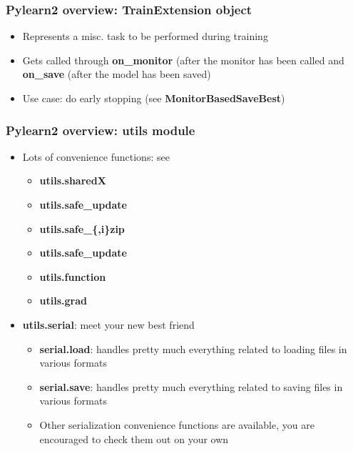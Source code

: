 \documentclass[mathserif, xcolor=dvipsnames]{beamer}
\begin{document}
\begin{frame}
    \frametitle{Pylearn2 overview: \textbf{TrainExtension} object}
    \begin{itemize}\addtolength{\itemsep}{0.5\baselineskip}
        \item{Represents a misc. task to be performed during training}
        \item{Gets called through \textbf{on\_monitor} (after the monitor has
              been called and \textbf{on\_save} (after the model has been saved)}
        \item{Use case: do early stopping (see \textbf{MonitorBasedSaveBest})}
    \end{itemize}

\end{frame}

\begin{frame}
    \frametitle{Pylearn2 overview: \textbf{utils} module}
    \begin{itemize}\addtolength{\itemsep}{0.5\baselineskip}
        \item{
            Lots of convenience functions: see
            \begin{itemize} 
                \item{\textbf{utils.sharedX}}
                \item{\textbf{utils.safe\_update}}
                \item{\textbf{utils.safe\_\{,i\}zip}}
                \item{\textbf{utils.safe\_update}}
                \item{\textbf{utils.function}}
                \item{\textbf{utils.grad}}
            \end{itemize} 
        }
        \item{
            \textbf{utils.serial}: meet your new best friend
            \begin{itemize}
                \item{\textbf{serial.load}: handles pretty much everything
                      related to loading files in various formats}
                \item{\textbf{serial.save}: handles pretty much everything
                      related to saving files in various formats}
                \item{Other serialization convenience functions are available,
                      you are encouraged to check them out on your own}
            \end{itemize}
        }
    \end{itemize}

\end{frame}
\end{document}
